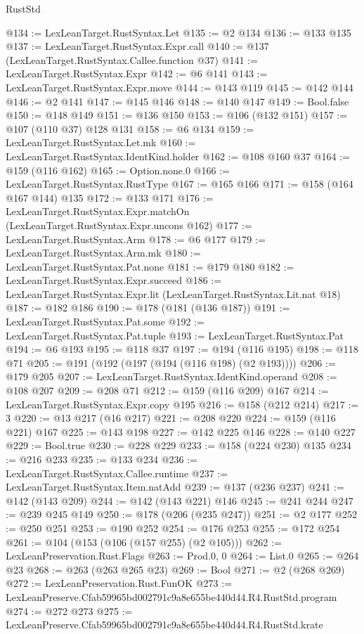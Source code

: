 \begin{lexlean}{RustStd}
\begin{coremodule}
@134 := LexLeanTarget.RustSyntax.Let
@135 := @2 @134
@136 := @133 @135
@137 := LexLeanTarget.RustSyntax.Expr.call
@140 := @137 (LexLeanTarget.RustSyntax.Callee.function @37)
@141 := LexLeanTarget.RustSyntax.Expr
@142 := @6 @141
@143 := LexLeanTarget.RustSyntax.Expr.move
@144 := @143 @119
@145 := @142 @144
@146 := @2 @141
@147 := @145 @146
@148 := @140 @147
@149 := Bool.false
@150 := @148 @149
@151 := @136 @150
@153 := @106 (@132 @151)
@157 := @107 (@110 @37) @128 @131
@158 := @6 @134
@159 := LexLeanTarget.RustSyntax.Let.mk
@160 := LexLeanTarget.RustSyntax.IdentKind.holder
@162 := @108 @160 @37
@164 := @159 (@116 @162)
@165 := Option.none.{0}
@166 := LexLeanTarget.RustSyntax.RustType
@167 := @165 @166
@171 := @158 (@164 @167 @144) @135
@172 := @133 @171
@176 := LexLeanTarget.RustSyntax.Expr.matchOn (LexLeanTarget.RustSyntax.Expr.uncons @162)
@177 := LexLeanTarget.RustSyntax.Arm
@178 := @6 @177
@179 := LexLeanTarget.RustSyntax.Arm.mk
@180 := LexLeanTarget.RustSyntax.Pat.none
@181 := @179 @180
@182 := LexLeanTarget.RustSyntax.Expr.succeed
@186 := LexLeanTarget.RustSyntax.Expr.lit (LexLeanTarget.RustSyntax.Lit.nat @18)
@187 := @182 @186
@190 := @178 (@181 (@136 @187))
@191 := LexLeanTarget.RustSyntax.Pat.some
@192 := LexLeanTarget.RustSyntax.Pat.tuple
@193 := LexLeanTarget.RustSyntax.Pat
@194 := @6 @193
@195 := @118 @37
@197 := @194 (@116 @195)
@198 := @118 @71
@205 := @191 (@192 (@197 (@194 (@116 @198) (@2 @193))))
@206 := @179 @205
@207 := LexLeanTarget.RustSyntax.IdentKind.operand
@208 := @108 @207
@209 := @208 @71
@212 := @159 (@116 @209) @167
@214 := LexLeanTarget.RustSyntax.Expr.copy @195
@216 := @158 (@212 @214)
@217 := 3
@220 := @13 @217 (@16 @217)
@221 := @208 @220
@224 := @159 (@116 @221) @167
@225 := @143 @198
@227 := @142 @225 @146
@228 := @140 @227
@229 := Bool.true
@230 := @228 @229
@233 := @158 (@224 @230) @135
@234 := @216 @233
@235 := @133 @234
@236 := LexLeanTarget.RustSyntax.Callee.runtime
@237 := LexLeanTarget.RustSyntax.Item.natAdd
@239 := @137 (@236 @237)
@241 := @142 (@143 @209)
@244 := @142 (@143 @221) @146
@245 := @241 @244
@247 := @239 @245 @149
@250 := @178 (@206 (@235 @247))
@251 := @2 @177
@252 := @250 @251
@253 := @190 @252
@254 := @176 @253
@255 := @172 @254
@261 := @104 (@153 (@106 (@157 @255) (@2 @105)))
@262 := LexLeanPreservation.Rust.Flags
@263 := Prod.{0, 0}
@264 := List.{0}
@265 := @264 @23
@268 := @263 (@263 @265 @23)
@269 := Bool
@271 := @2 (@268 @269)
@272 := LexLeanPreservation.Rust.FunOK
@273 := LexLeanPreserve.Cfab59965bd002791c9a8e655be440d44.R4.RustStd.program
@274 := @272 @273
@275 := LexLeanPreserve.Cfab59965bd002791c9a8e655be440d44.R4.RustStd.krate

\end{coremodule}
\end{lexlean}
